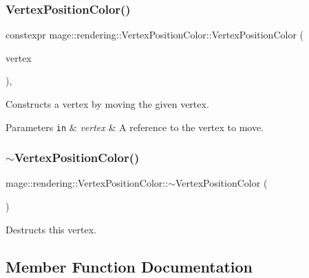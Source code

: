 \subsubsection{\texorpdfstring{Vertex\+Position\+Color()}{VertexPositionColor()}\hspace{0.1cm}{\footnotesize\ttfamily [4/4]}}
{\footnotesize\ttfamily constexpr mage\+::rendering\+::\+Vertex\+Position\+Color\+::\+Vertex\+Position\+Color (\begin{DoxyParamCaption}\item[{\hyperlink{structmage_1_1rendering_1_1_vertex_position_color}{Vertex\+Position\+Color} \&\&}]{vertex }\end{DoxyParamCaption})\hspace{0.3cm}{\ttfamily [default]}, {\ttfamily [noexcept]}}

Constructs a vertex by moving the given vertex.


\begin{DoxyParams}[1]{Parameters}
\mbox{\tt in}  & {\em vertex} & A reference to the vertex to move. \\
\hline
\end{DoxyParams}
\hypertarget{structmage_1_1rendering_1_1_vertex_position_color_a80120768659e011119843c29df379e13}{}\label{structmage_1_1rendering_1_1_vertex_position_color_a80120768659e011119843c29df379e13} 
\subsubsection{\texorpdfstring{$\sim$\+Vertex\+Position\+Color()}{~VertexPositionColor()}}
{\footnotesize\ttfamily mage\+::rendering\+::\+Vertex\+Position\+Color\+::$\sim$\+Vertex\+Position\+Color (\begin{DoxyParamCaption}{ }\end{DoxyParamCaption})\hspace{0.3cm}{\ttfamily [default]}}

Destructs this vertex. 

\subsection{Member Function Documentation}
\hypertarget{structmage_1_1rendering_1_1_vertex_position_color_aea75d3acadad3cd6da04d0fc2207fc0c}{}\label{structmage_1_1rendering_1_1_vertex_position_color_aea75d3acadad3cd6da04d0fc2207fc0c} 
